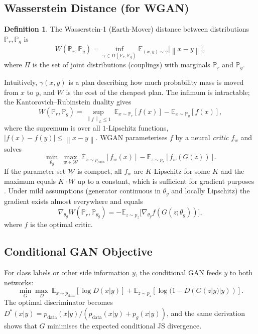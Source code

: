 \documentclass[conference]{IEEEtran}
\newcommand{\E}{\mathbb{E}}
\newcommand{\pdata}{p_{\mathrm{data}}}
\newcommand{\pg}{p_{g}}
\newcommand{\pz}{p_{z}}
\newcommand{\thg}{\theta_g}
\newcommand{\norm}[1]{\left\lVert #1 \right\rVert}
\theoremstyle{plain}
\theoremstyle{definition}
\newtheorem{definition}{Definition}
\begin{document}
\subsection{Wasserstein Distance (for WGAN)}
\begin{definition}
The Wasserstein-1 (Earth-Mover) distance between distributions $\mathbb{P}_r,\mathbb{P}_g$ is
\begin{equation}
W(\mathbb{P}_r,\mathbb{P}_g)=\inf_{\gamma\in\Pi(\mathbb{P}_r,\mathbb{P}_g)}\E_{(x,y)\sim\gamma}\big[\norm{x-y}\big],
\label{eq:w1}
\end{equation}
where $\Pi$ is the set of joint distributions (couplings) with marginals $\mathbb{P}_r$ and $\mathbb{P}_g$.
\end{definition}
Intuitively, $\gamma(x,y)$ is a plan describing how much probability mass is moved from $x$ to $y$, and $W$ is the cost of the cheapest plan. The infimum is intractable; the Kantorovich--Rubinstein duality \cite{villani2009optimal} gives
\begin{equation}
W(\mathbb{P}_r,\mathbb{P}_g)=\sup_{\norm{f}_L\le1}\ \E_{x\sim\mathbb{P}_r}[f(x)]-\E_{x\sim\mathbb{P}_g}[f(x)],
\label{eq:kr}
\end{equation}
where the supremum is over all $1$-Lipschitz functions, $|f(x)-f(y)|\le\norm{x-y}$. WGAN parameterises $f$ by a neural \emph{critic} $f_w$ and solves
\begin{equation}
\min_{\thg}\ \max_{w\in\mathcal{W}}\ \E_{x\sim\pdata}[f_w(x)]-\E_{z\sim\pz}[f_w(G(z))].
\label{eq:wgan}
\end{equation}
If the parameter set $\mathcal{W}$ is compact, all $f_w$ are $K$-Lipschitz for some $K$ and the maximum equals $K\cdot W$ up to a constant, which is sufficient for gradient purposes \cite{arjovsky2017wgan}. Under mild assumptions (generator continuous in $\thg$ and locally Lipschitz) the gradient exists almost everywhere and equals
\begin{equation}
\nabla_{\thg}W(\mathbb{P}_r,\mathbb{P}_{\thg})=-\E_{z\sim\pz}\big[\nabla_{\thg}f(G(z;\thg))\big],
\label{eq:wgrad}
\end{equation}
where $f$ is the optimal critic.

\subsection{Conditional GAN Objective}
For class labels or other side information $y$, the conditional GAN \cite{mirza2014cgan} feeds $y$ to both networks:
\begin{equation}
\min_G\max_D\ \E_{x\sim\pdata}[\log D(x|y)]+\E_{z\sim\pz}[\log(1-D(G(z|y)|y))].
\label{eq:cgan}
\end{equation}
The optimal discriminator becomes $D^*(x|y)=\pdata(x|y)/(\pdata(x|y)+\pg(x|y))$, and the same derivation shows that $G$ minimises the expected conditional JS divergence.
\end{document}
